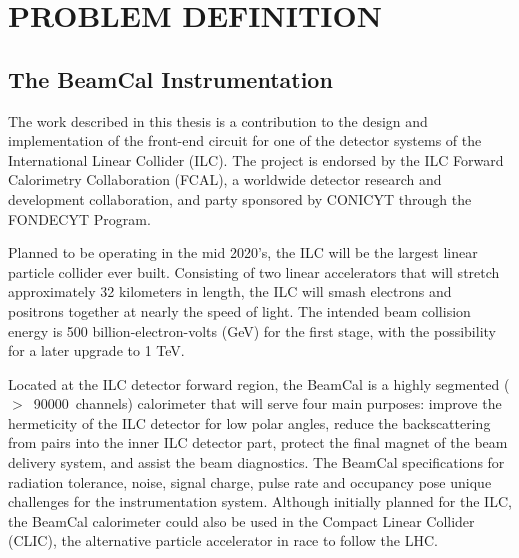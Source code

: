 \chapter{PROBLEM DEFINITION}
\label{chapter:problem}
\section{The BeamCal Instrumentation }

The work described in this thesis is a contribution to the design and implementation of the front-end circuit for one of the detector systems of the International Linear Collider (ILC). The project is endorsed by the ILC Forward Calorimetry Collaboration (FCAL), a worldwide detector research and development collaboration, and party sponsored by CONICYT through the FONDECYT Program.

Planned to be operating in the mid 2020’s, the ILC will be the largest linear particle collider ever built. Consisting of two linear accelerators that will stretch approximately 32 kilometers in length, the ILC will smash electrons and positrons together at nearly the speed of light. The intended beam collision energy is 500 billion-electron-volts (GeV) for the first stage, with the possibility for a later upgrade to 1 TeV. 
 
Located at the ILC detector forward region, the BeamCal is a highly segmented \mbox{($>$ 90000 channels)} calorimeter that will serve four main purposes: improve the hermeticity of the ILC detector for low polar angles, reduce the backscattering from pairs into the inner ILC detector part, protect the final magnet of the beam delivery system, and assist the beam diagnostics. The BeamCal specifications for radiation tolerance, noise, signal charge, pulse rate and occupancy pose unique challenges for the instrumentation system. Although initially planned  for the ILC, the BeamCal calorimeter could also be used in the Compact Linear Collider (CLIC), the alternative particle accelerator in race to follow the LHC.

